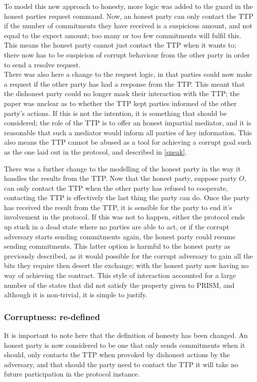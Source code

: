\documentclass{l4proj}
\begin{document}
To model this new approach to honesty, more logic was added to the guard in the honest parties request command. Now, an honest party can only contact the TTP if the number of commitments they have received is a suspicious amount, and not equal to the expect amount; too many or too few commitments will fulfil this. This means the honest party cannot just contact the TTP when it wants to; there now has to be suspicion of corrupt behaviour from the other party in order to send a resolve request.\\
There was also here a change to the request logic, in that parties could now make a request if the other party has had a response from the TTP. This meant that the dishonest party could no longer mask their interaction with the TTP; the paper was unclear as to whether the TTP kept parties informed of the other party's actions. If this is not the intention, it is something that should be considered; the role of the TTP is to offer an honest impartial mediator, and it is reasonable that such a mediator would inform all parties of key information. This also means the TTP cannot be abused as a tool for achieving a corrupt goal such as the one laid out in the protocol, and described in \ref{sneak}. 


There was a further change to the modelling of the honest party in the way it handles the results from the TTP. Now that the honest party, suppose party $O$, can only contact the TTP when the other party has refused to cooperate, contacting the TTP is effectively the last thing the party can do. Once the party has received the result from the TTP, it is sensible for the party to end it's involvement in the protocol. If this was not to happen, either the protocol ends up stuck in a dead state where no parties are able to act, or if the corrupt adversary starts sending commitments again, the honest party could resume sending commitments. This latter option is harmful to the honest party as previously described, as it would possible for the corrupt adversary to gain all the bits they require then desert the exchange; with the honest party now having no way of achieving the contract. This style of interaction accounted for a large number of the states that did not satisfy the property given to PRISM, and although it is non-trivial, it is simple to justify. 

\subsubsection{Corruptness: re-defined}
It is important to note here that the definition of honesty has been changed. An honest party is now considered to be one that only sends commitments when it should, only contacts the TTP when provoked by dishonest actions by the adversary, and that should the party need to contact the TTP it will take no future participation in the protocol instance.
\end{document}
